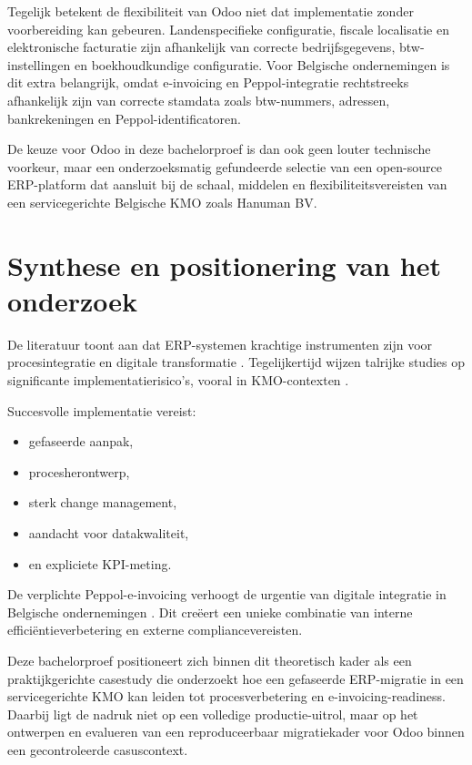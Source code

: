Tegelijk betekent de flexibiliteit van Odoo niet dat implementatie zonder voorbereiding kan gebeuren. Landenspecifieke configuratie, fiscale localisatie en elektronische facturatie zijn afhankelijk van correcte bedrijfsgegevens, btw-instellingen en boekhoudkundige configuratie. Voor Belgische ondernemingen is dit extra belangrijk, omdat e-invoicing en Peppol-integratie rechtstreeks afhankelijk zijn van correcte stamdata zoals btw-nummers, adressen, bankrekeningen en Peppol-identificatoren.

De keuze voor Odoo in deze bachelorproef is dan ook geen louter technische voorkeur, maar een onderzoeksmatig gefundeerde selectie van een open-source ERP-platform dat aansluit bij de schaal, middelen en flexibiliteitsvereisten van een servicegerichte Belgische KMO zoals Hanuman BV.

\section{Synthese en positionering van het onderzoek}

De literatuur toont aan dat ERP-systemen krachtige instrumenten zijn voor procesintegratie en digitale transformatie \autocite{Davenport1998,Matt2015}. Tegelijkertijd wijzen talrijke studies op significante implementatierisico’s, vooral in KMO-contexten \autocite{Nah2001,Haddara2011,Aloini2007}.

Succesvolle implementatie vereist:
\begin{itemize}
    \item gefaseerde aanpak,
    \item procesherontwerp,
    \item sterk change management,
    \item aandacht voor datakwaliteit,
    \item en expliciete KPI-meting.
\end{itemize}

De verplichte Peppol-e-invoicing verhoogt de urgentie van digitale integratie in Belgische ondernemingen \autocite{Deloitte_2024}. Dit creëert een unieke combinatie van interne efficiëntieverbetering en externe compliancevereisten.

Deze bachelorproef positioneert zich binnen dit theoretisch kader als een praktijkgerichte casestudy die onderzoekt hoe een gefaseerde ERP-migratie in een servicegerichte KMO kan leiden tot procesverbetering en e-invoicing-readiness. Daarbij ligt de nadruk niet op een volledige productie-uitrol, maar op het ontwerpen en evalueren van een reproduceerbaar migratiekader voor Odoo binnen een gecontroleerde casuscontext.
